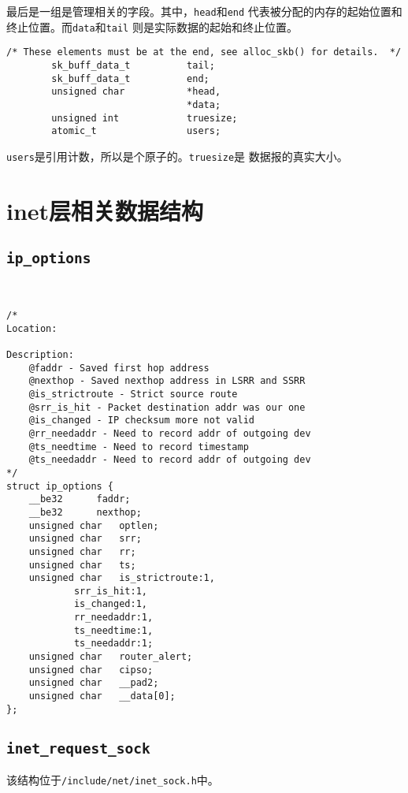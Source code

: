 最后是一组是管理相关的字段。其中，\texttt{head}和\texttt{end}
代表被分配的内存的起始位置和终止位置。而\texttt{data}和\texttt{tail}
则是实际数据的起始和终止位置。
\begin{verbatim}
/* These elements must be at the end, see alloc_skb() for details.  */
        sk_buff_data_t          tail;
        sk_buff_data_t          end;
        unsigned char           *head,
                                *data;
        unsigned int            truesize;
        atomic_t                users;
\end{verbatim}
\texttt{users}是引用计数，所以是个原子的。\texttt{truesize}是
数据报的真实大小。
    \section{inet层相关数据结构}
		\subsection{\texttt{ip_options}}

\begin{verbatim}


/*
Location:

Description:
	@faddr - Saved first hop address
	@nexthop - Saved nexthop address in LSRR and SSRR
	@is_strictroute - Strict source route
	@srr_is_hit - Packet destination addr was our one
	@is_changed - IP checksum more not valid
	@rr_needaddr - Need to record addr of outgoing dev
	@ts_needtime - Need to record timestamp
	@ts_needaddr - Need to record addr of outgoing dev
*/
struct ip_options {
	__be32		faddr;
	__be32		nexthop;
	unsigned char	optlen;
	unsigned char	srr;
	unsigned char	rr;
	unsigned char	ts;
	unsigned char	is_strictroute:1,
			srr_is_hit:1,
			is_changed:1,
			rr_needaddr:1,
			ts_needtime:1,
			ts_needaddr:1;
	unsigned char	router_alert;
	unsigned char	cipso;
	unsigned char	__pad2;
	unsigned char	__data[0];
};
\end{verbatim}    
        \subsection{\texttt{inet_request_sock}}

        该结构位于\texttt{/include/net/inet_sock.h}中。

